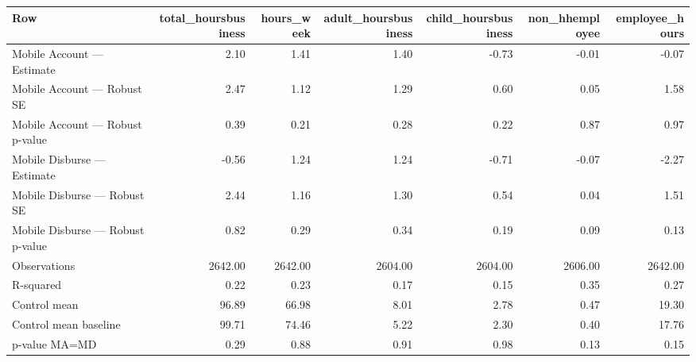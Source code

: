
\begin{tabular}{lrrrrrr}
\toprule
Row & total\_hoursbusiness & hours\_week & adult\_hoursbusiness & child\_hoursbusiness & non\_hhemployee & employee\_hours\\
\midrule
Mobile Account — Estimate & 2.10 & 1.41 & 1.40 & -0.73 & -0.01 & -0.07\\
Mobile Account — Robust SE & 2.47 & 1.12 & 1.29 & 0.60 & 0.05 & 1.58\\
Mobile Account — Robust p-value & 0.39 & 0.21 & 0.28 & 0.22 & 0.87 & 0.97\\
Mobile Disburse — Estimate & -0.56 & 1.24 & 1.24 & -0.71 & -0.07 & -2.27\\
Mobile Disburse — Robust SE & 2.44 & 1.16 & 1.30 & 0.54 & 0.04 & 1.51\\
\addlinespace
Mobile Disburse — Robust p-value & 0.82 & 0.29 & 0.34 & 0.19 & 0.09 & 0.13\\
Observations & 2642.00 & 2642.00 & 2604.00 & 2604.00 & 2606.00 & 2642.00\\
R-squared & 0.22 & 0.23 & 0.17 & 0.15 & 0.35 & 0.27\\
Control mean & 96.89 & 66.98 & 8.01 & 2.78 & 0.47 & 19.30\\
Control mean baseline & 99.71 & 74.46 & 5.22 & 2.30 & 0.40 & 17.76\\
\addlinespace
p-value MA=MD & 0.29 & 0.88 & 0.91 & 0.98 & 0.13 & 0.15\\
\bottomrule
\end{tabular}
